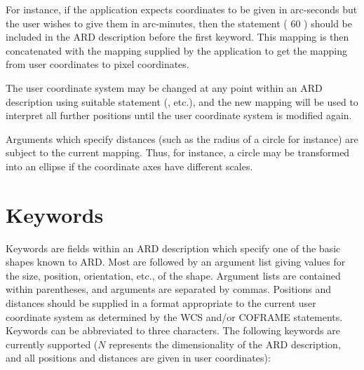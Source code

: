 For instance, if the application expects coordinates to be given in
arc-seconds but the user wishes to give them in arc-minutes, then the
statement ( 60 ) should be included in the ARD
description before the first keyword. This mapping is then concatenated
with the mapping supplied by the application to get the mapping from user
coordinates to pixel coordinates.

The user coordinate system may be changed at any point within an ARD
description using suitable statement (, etc.),
and the new mapping will be used to interpret all further positions until
the user coordinate system is modified again.

Arguments which specify distances (such as the radius of a circle for instance)
are subject to the current mapping. Thus, for instance, a circle may be
transformed into an ellipse if the coordinate axes have different scales. 

\section{\label{SEC:KEYW}Keywords}
Keywords are fields within an ARD description which specify one of the
basic shapes known to ARD. Most are followed by an argument list giving
values for the size, position, orientation, etc., of the shape. Argument
lists are contained within parentheses, and arguments are separated by
commas. Positions and distances should be supplied in a format
appropriate to the current user coordinate system as determined by the
WCS and/or COFRAME statements. Keywords can be abbreviated to three
characters. The following keywords are currently supported ($N$
represents the dimensionality of the ARD description, and all positions
and distances are given in user coordinates):

